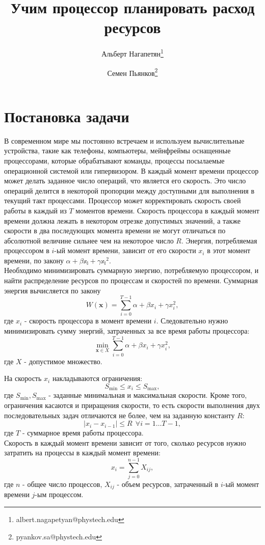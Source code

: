 \documentclass{article}
\title{Учим процессор планировать расход ресурсов}
\author{Альберт Нагапетян\footnote{albert.nagapetyan@phystech.edu} \and Семен Пьянков\footnote{pyankov.sa@phystech.edu}}
\date{}
\begin{document}
\maketitle

\section{Постановка задачи}
В современном мире мы постоянно встречаем и используем  вычислительные устройства, такие как телефоны, компьютеры, мейнфреймы оснащенные процессорами, которые обрабатывают команды, процессы посылаемые операционной системой или гипервизором. В каждый момент времени процессор может делать заданное число операций, что является его скорость. Это число операций делится в некоторой пропорции между доступными для выполнения в текущий такт процессами. Процессор может корректировать скорость своей работы в каждый из $T$ моментов времени. Скорость процессора в каждый момент времени должна лежать в некотором отрезке допустимых значений, а также скорости в два последующих момента времени не могут отличаться по абсолютной величине сильнее чем на некоторое число $R$. Энергия, потребляемая процессором в $i$-ый момент времени, зависит от его скорости $x_i$ в этот момент времени, по закону $\alpha + \beta \mathbb{x_i} + \gamma \mathbb{x_i}^2$. \\

Необходимо минимизировать суммарную энергию, потребляемую процессором, и найти распределение ресурсов по процессам и скоростей по времени.  
Суммарная энергия вычисляется по закону $$W(\mathbf{x}) = \sum\limits_{i=0}^{T-1} \alpha + \beta x_i + \gamma x_i^2,$$ где $x_i$ - скорость процессора в момент времени $i$. Следовательно нужно минимизировать сумму энергий, затраченных за все время работы процессора: $$\min \limits_{\textbf{x} \in X} \sum \limits_{i=0}^{T-1} \alpha + \beta x_i + \gamma x_i^2,$$ где $X$ - допустимое множество.

На скорость $x_i$ накладываются ограничения: $$S_{\min} \le x_i \le S_{\max},$$ где $S_{\min}, S_{\max}$ - заданные минимальная и максимальная скорости. Кроме того, ограничения касаются и приращения скорости, то есть скорости выполнения двух последовательных задач отличаются не более, чем на заданную константу $R$: $$|x_i-x_{i-1}| \le R ~~ \forall i = 1 \dots T-1,$$ где $T$ - суммарное время работы процессора. \\

Скорость в каждый момент времени зависит от того, сколько ресурсов нужно затратить на процессы в каждый момент времени:
$$x_i = \sum \limits_{j=0}^{n-1} X_{ij},$$ где $n$ - общее число процессов, $X_{ij}$ - объем ресурсов, затраченный в $i$-ый момент времени $j$-ым процессом.\\
\end{document}
